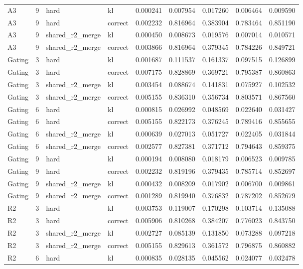 \begin{tabular}{lrllrrrrr}
A3 & 9 & hard & kl & 0.000241 & 0.007954 & 0.017260 & 0.006464 & 0.009590 \\
A3 & 9 & hard & correct & 0.002232 & 0.816964 & 0.383904 & 0.783464 & 0.851190 \\
A3 & 9 & shared_r2_merge & kl & 0.000450 & 0.008673 & 0.019576 & 0.007014 & 0.010571 \\
A3 & 9 & shared_r2_merge & correct & 0.003866 & 0.816964 & 0.379345 & 0.784226 & 0.849721 \\
Gating & 3 & hard & kl & 0.001687 & 0.111537 & 0.161337 & 0.097515 & 0.126899 \\
Gating & 3 & hard & correct & 0.007175 & 0.828869 & 0.369721 & 0.795387 & 0.860863 \\
Gating & 3 & shared_r2_merge & kl & 0.003454 & 0.088674 & 0.141831 & 0.075927 & 0.102532 \\
Gating & 3 & shared_r2_merge & correct & 0.005155 & 0.836310 & 0.356734 & 0.803571 & 0.867560 \\
Gating & 6 & hard & kl & 0.000815 & 0.026992 & 0.048569 & 0.022640 & 0.031427 \\
Gating & 6 & hard & correct & 0.005155 & 0.822173 & 0.376245 & 0.789416 & 0.855655 \\
Gating & 6 & shared_r2_merge & kl & 0.000639 & 0.027013 & 0.051727 & 0.022405 & 0.031844 \\
Gating & 6 & shared_r2_merge & correct & 0.002577 & 0.827381 & 0.371712 & 0.794643 & 0.859375 \\
Gating & 9 & hard & kl & 0.000194 & 0.008080 & 0.018179 & 0.006523 & 0.009785 \\
Gating & 9 & hard & correct & 0.002232 & 0.819196 & 0.379435 & 0.785714 & 0.852697 \\
Gating & 9 & shared_r2_merge & kl & 0.000432 & 0.008209 & 0.017902 & 0.006700 & 0.009861 \\
Gating & 9 & shared_r2_merge & correct & 0.001289 & 0.819940 & 0.376832 & 0.787202 & 0.852679 \\
R2 & 3 & hard & kl & 0.003753 & 0.119007 & 0.170298 & 0.103714 & 0.135088 \\
R2 & 3 & hard & correct & 0.005906 & 0.810268 & 0.384207 & 0.776023 & 0.843750 \\
R2 & 3 & shared_r2_merge & kl & 0.002727 & 0.085139 & 0.131850 & 0.073288 & 0.097218 \\
R2 & 3 & shared_r2_merge & correct & 0.005155 & 0.829613 & 0.361572 & 0.796875 & 0.860882 \\
R2 & 6 & hard & kl & 0.000835 & 0.028135 & 0.045562 & 0.024077 & 0.032478 \\

\end{tabular}
